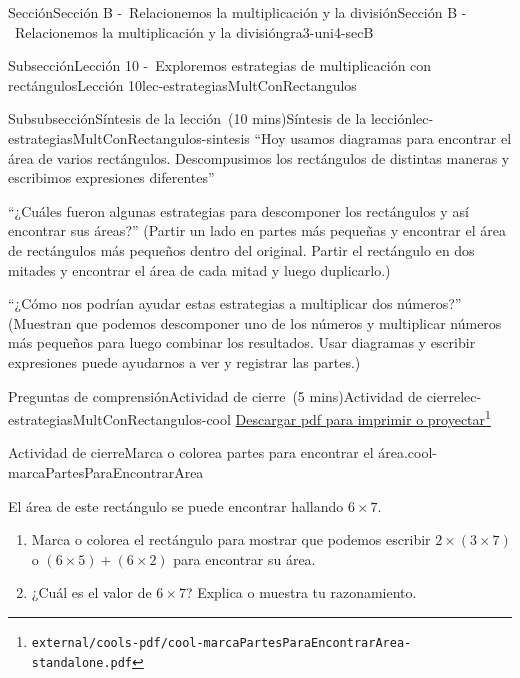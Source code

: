 \documentclass[oneside,10pt,]{article}
\begin{document}
\begin{sectionptx}{Sección}{Sección B -~Relacionemos la multiplicación y la división}{}{Sección B -~Relacionemos la multiplicación y la división}{}{}{gra3-uni4-secB}
\begin{subsectionptx}{Subsección}{Lección 10 -~Exploremos estrategias de multiplicación con rectángulos}{}{Lección 10}{}{}{lec-estrategiasMultConRectangulos}
\begin{subsubsectionptx}{Subsubsección}{Síntesis de la lección~(10 mins)}{}{Síntesis de la lección}{}{}{lec-estrategiasMultConRectangulos-sintesis}
``Hoy usamos diagramas para encontrar el área de varios rectángulos. Descompusimos los rectángulos de distintas maneras y escribimos expresiones diferentes''%
\par
``¿Cuáles fueron algunas estrategias para descomponer los rectángulos y así encontrar sus áreas?'' (Partir un lado en partes más pequeñas y encontrar el área de rectángulos más pequeños dentro del original. Partir el rectángulo en dos mitades y encontrar el área de cada mitad y luego duplicarlo.)%
\par
``¿Cómo nos podrían ayudar estas estrategias a multiplicar dos números?'' (Muestran que podemos descomponer uno de los números y multiplicar números más pequeños para luego combinar los resultados. Usar diagramas y escribir expresiones puede ayudarnos a ver y registrar las partes.)%
\end{subsubsectionptx}
%
%
\typeout{************************************************}
\typeout{************************************************}
%
\begin{reading-questions-subsubsection}{Preguntas de comprensión}{Actividad de cierre~(5 mins)}{}{Actividad de cierre}{}{}{lec-estrategiasMultConRectangulos-cool}
\href{external/cools-pdf/cool-marcaPartesParaEncontrarArea-standalone.pdf}{Descargar pdf para imprimir o proyectar}\footnote{\nolinkurl{external/cools-pdf/cool-marcaPartesParaEncontrarArea-standalone.pdf}\label{lec-estrategiasMultConRectangulos-cool-5}}\begin{project}{Actividad de cierre}{Marca o colorea partes para encontrar el área.}{cool-marcaPartesParaEncontrarArea}%
\begin{sidebyside}{2}{0}{0}{0}%
\begin{sbspanel}{0.6}%
El área de este rectángulo se puede encontrar hallando \(6 \times 7\).%
%
\begin{enumerate}[label={(\alph*)}]
\item{}Marca o colorea el rectángulo para mostrar que podemos escribir \(2 \times (3 \times 7)\) o \((6 \times 5) + (6 \times 2)\) para encontrar su área.%
\item{}¿Cuál es el valor de \(6 \times 7\)? Explica o muestra tu razonamiento.%
\end{enumerate}
\end{sbspanel}%
\begin{sbspanel}{0.4}%

\end{sbspanel}
\end{sidebyside}
\end{project}
\end{reading-questions-subsubsection}
\end{subsectionptx}
\end{sectionptx}
\end{document}
